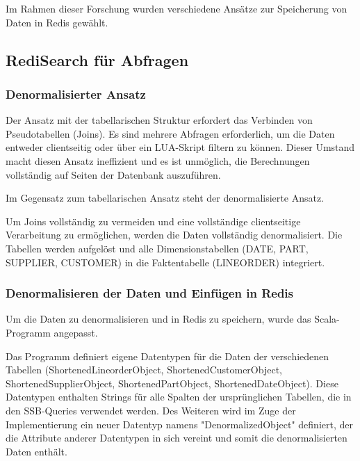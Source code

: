 Im Rahmen dieser Forschung wurden verschiedene Ansätze zur Speicherung von Daten in Redis gewählt.




\subsection{RediSearch für Abfragen}



\subsubsection{Denormalisierter Ansatz}
Der Ansatz mit der tabellarischen Struktur erfordert das Verbinden von Pseudotabellen (Joins).
Es sind mehrere Abfragen erforderlich, um die Daten entweder clientseitig oder über ein LUA-Skript filtern zu können.
Dieser Umstand macht diesen Ansatz ineffizient und es ist unmöglich, die Berechnungen vollständig auf Seiten der Datenbank auszuführen.

Im Gegensatz zum tabellarischen Ansatz steht der denormalisierte Ansatz.

Um Joins vollständig zu vermeiden und eine vollständige clientseitige Verarbeitung zu ermöglichen, werden die Daten vollständig denormalisiert.
Die Tabellen werden aufgelöst
und alle Dimensionstabellen (DATE, PART, SUPPLIER, CUSTOMER) in die Faktentabelle (LINEORDER) integriert.

\subsubsection{Denormalisieren der Daten und Einfügen in Redis}
Um die Daten zu denormalisieren und in Redis zu speichern, wurde das Scala-Programm angepasst.

Das Programm definiert eigene Datentypen für die Daten der verschiedenen Tabellen (ShortenedLineorderObject, ShortenedCustomerObject, ShortenedSupplierObject, ShortenedPartObject, ShortenedDateObject).
Diese Datentypen enthalten Strings für alle Spalten der ursprünglichen Tabellen, die in den \acs{SSB}-Queries verwendet werden.
Des Weiteren wird im Zuge der Implementierung ein neuer Datentyp namens "DenormalizedObject" definiert,
der die Attribute anderer Datentypen in sich vereint und somit die denormalisierten Daten enthält.

